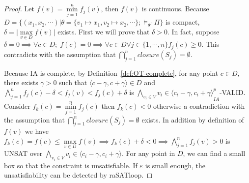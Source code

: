 \begin{proof}
\sloppy
Let $f(v) = \min\limits_{j = 1}^nf_j(v)$, then $f(v)$ is continuous. Because ${D = \{(x_1, x_2, \cdots) | \theta = \{v_1 \mapsto x_1, v_2 \mapsto x_2, \cdots\}; \models_{\theta^I} \Pi\}}$ is compact, ${\delta = |\max\limits_{v \in D}f(v)}|$ exists. First we will prove that $\delta > 0$. In fact, suppose $\delta = 0 \implies \forall c \in D; \; f(c) = 0 \implies \forall c \in D \forall j \in \{1, \cdots, n\}f_j(c) \ge 0$. This contradicts with the assumption that $\bigcap\limits_{j = 1}^nclosure(S_j) = \emptyset$.

Because IA is complete, by Definition~\ref{def:OT-complete}, for any point $c \in D$, there exists $\gamma > 0$ such that $\langle c - \gamma, c + \gamma \rangle \in D$ and $\bigwedge\limits_{j = 1}^n f_j(c) - \delta < f_j(v) < f_j(c) + \delta$ is ${\bigwedge\limits_{v_i \in V}v_i \in \langle c_i - \gamma, c_i + \gamma \rangle}^p_{IA}$-VALID. Consider $f_k(c) = \min\limits_{j=1}^nf_j(c)$ then $f_k(c) < 0$ otherwise a contradiction with the assumption that $\bigcap\limits_{j = 1}^nclosure(S_j) = \emptyset$ exists. In addition by definition of $f(v)$ we have $f_k(c) = f(c) \le \max\limits_{v \in D}f(v) \implies f_k(c) + \delta < 0 \implies \bigwedge\limits_{j = 1}^n f_j(v) > 0$ is UNSAT over $\bigwedge\limits_{v_i \in V}v_i \in \langle c_i - \gamma, c_i + \gamma \rangle$. For any point in $D$, we can find a small box so that the constraint is unsatisfiable. If $\varepsilon$ is small enough, the unsatisfiability can be detected by raSATloop.
\end{proof}


